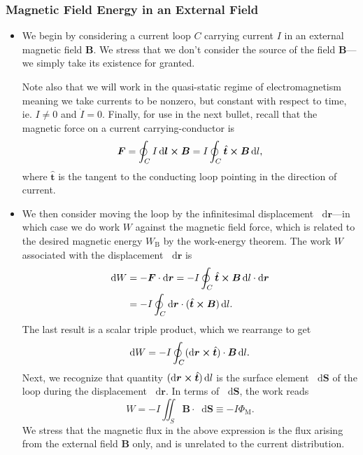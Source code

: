 \documentclass[11pt, a4paper]{article}
\newcommand{\diff}{\mathop{}\!\mathrm{d}} %
\renewcommand{\vec}[1]{\bm{#1}} %
\newcommand{\uvec}[1]{\hat{\vec{#1}}} %
\renewcommand{\r}{\vec{r}}
\newcommand{\B}{\vec{B}} %
\begin{document}
\subsubsection{Magnetic Field Energy in an External Field}
\begin{itemize}
	\item We begin by considering a current loop $ C $ carrying current $ I $ in an external magnetic field $ \B $. We stress that we don't consider the source of the field $ \B $---we simply take its existence for granted. 
	
    Note also that we will work in the quasi-static regime of electromagnetism meaning we take currents to be nonzero, but constant with respect to time, ie. $ I \neq 0 $ and $ \dot{I} = 0 $. Finally, for use in the next bullet, recall that the magnetic force on a current carrying-conductor is
	\begin{equation*}
		\vec{F} = \oint_{C} I \diff \vec{l} \cross \B = I \oint_{C} \uvec{t} \cross \B \diff l,
	\end{equation*}
	where $ \uvec{t} $ is the tangent to the conducting loop pointing in the direction of current.
	
	\item We then consider moving the loop by the infinitesimal displacement $ \diff \r $---in which case we do work $ W $ against the magnetic field force, which is related to the desired magnetic energy $ W_{\mathrm{B}} $ by the work-energy theorem. The work $ W $ associated with the displacement $ \diff \r $ is
	\begin{align*}
		\diff W &= - \vec{F} \cdot \diff \r =  -I \oint_{C} \uvec{t} \cross \B \diff l \cdot \diff \r\\
		& = - I \oint_{C}\diff \r \cdot (\uvec{t} \cross \B) \diff l.
	\end{align*}
    The last result is a scalar triple product, which we rearrange to get
	\begin{equation*}
		\diff W = - I \oint_{C} (\diff \r \cross \uvec{t})\cdot \B \diff l.
	\end{equation*}
	Next, we recognize that quantity $ (\diff \r \cross \uvec{t}) \diff l $ is the surface element $ \diff \vec{S} $  of the loop during the displacement $ \diff \r $. In terms of $ \diff \vec{S} $, the work reads
	\begin{equation*}
		W = - I \iint_{S} \B \cdot \diff \vec{S} \equiv - I \Phi_{\mathrm{M}}.
	\end{equation*}
    We stress that the magnetic flux in the above expression is the flux arising from the external field $ \B $ only, and is unrelated to the current distribution.
	

\end{itemize}
\end{document}
